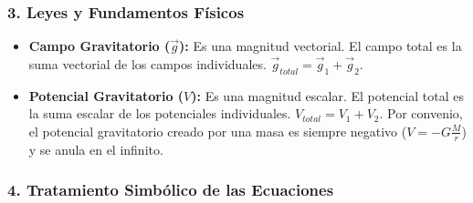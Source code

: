 \subsubsection*{3. Leyes y Fundamentos Físicos}
\begin{itemize}
    \item \textbf{Campo Gravitatorio ($\vec{g}$):} Es una magnitud vectorial. El campo total es la suma vectorial de los campos individuales. $\vec{g}_{total} = \vec{g}_1 + \vec{g}_2$.
    \item \textbf{Potencial Gravitatorio ($V$):} Es una magnitud escalar. El potencial total es la suma escalar de los potenciales individuales. $V_{total} = V_1 + V_2$. Por convenio, el potencial gravitatorio creado por una masa es siempre negativo ($V = -G\frac{M}{r}$) y se anula en el infinito.
\end{itemize}

\subsubsection*{4. Tratamiento Simbólico de las Ecuaciones}
